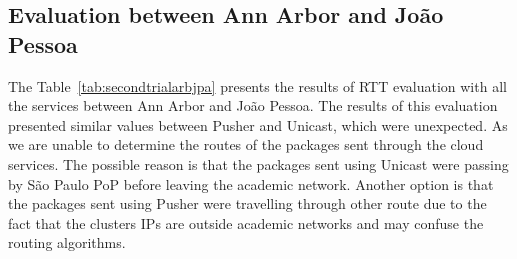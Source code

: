 \subsection*{Evaluation between Ann Arbor and João Pessoa} 

The Table~\ref{tab:secondtrialarbjpa} presents the results of RTT evaluation with all the services between Ann Arbor and João Pessoa.
The results of this evaluation presented similar values between Pusher and Unicast, which were unexpected.
As we are unable to determine the routes of the packages sent through the cloud services.
The possible reason is that the packages sent using Unicast were passing by São Paulo PoP before leaving the academic network.
Another option is that the packages sent using Pusher were travelling through other route due to the fact that the clusters IPs are outside academic networks and may confuse the routing algorithms.

